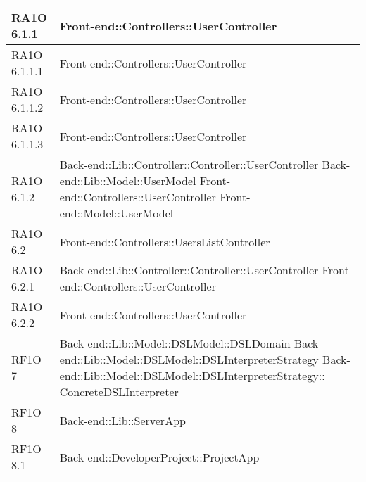 \begin{center}
\begin{longtable}{ | p{3cm} | p{11cm} | }
    RA1O 6.1.1 & Front-end::Controllers::UserController \newline  \\ \hline     
     
    RA1O 6.1.1.1 & Front-end::Controllers::UserController \newline  \\ \hline
        
    RA1O 6.1.1.2 & Front-end::Controllers::UserController \newline  \\ \hline
        
    RA1O 6.1.1.3 & Front-end::Controllers::UserController \newline  \\ \hline
       
    RA1O 6.1.2 & Back-end::Lib::Controller::Controller::UserController \newline Back-end::Lib::Model::UserModel \newline Front-end::Controllers::UserController \newline Front-end::Model::UserModel \newline  \\ \hline     
    
    
    RA1O 6.2 & Front-end::Controllers::UsersListController  \\ \hline     
     
    RA1O 6.2.1 & Back-end::Lib::Controller::Controller::UserController \newline Front-end::Controllers::UserController \newline  \\ \hline      
    RA1O 6.2.2 & Front-end::Controllers::UserController \newline  \\ \hline      
      
    RF1O 7 & Back-end::Lib::Model::DSLModel::DSLDomain \newline Back-end::Lib::Model::DSLModel::DSLInterpreterStrategy \newline Back-end::Lib::Model::DSLModel::DSLInterpreterStrategy:: \newline ConcreteDSLInterpreter  \\ \hline      
    
    RF1O 8 & Back-end::Lib::ServerApp \newline  \\ \hline   
       
    RF1O 8.1  & Back-end::DeveloperProject::ProjectApp \newline  \\ \hline  
        

\end{longtable}
\end{center}

